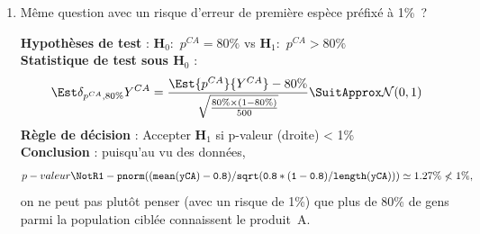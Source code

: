 \documentclass[10pt]{report}
\begin{document}
\begin{exercice}
\begin{enumerate}
\IndicR
\begin{Verbatim}[frame=leftline,fontfamily=tt,fontshape=n,numbers=left]
> yCA
  [1] 1 0 1 1 1 1 0 1 1 1 0 1 1 1 1 1 1 1 1 1 0 1 1 1 0 0 1 1 1 1 1 1 1 1 1 1 1
 [38] 1 1 0 1 0 1 1 1 1 1 1 1 0 1 1 1 0 1 0 1 1 1 0 0 1 1 1 1 1 1 1 1 1 1 1 1 1
...
[445] 1 1 1 0 1 1 1 1 1 0 1 0 1 1 1 1 1 1 1 1 1 1 1 1 1 1 1 0 1 1 1 1 0 0 1 1 1
[482] 1 1 1 1 1 1 1 0 1 1 1 1 1 1 1 1 1 1 1
> mean(yCA)
[1] 0.84
> # deltaEst.H0 <- (instruction R à fournir dans la rédaction)
> deltaEst.H0
[1] 2.236068
> pnorm(deltaEst.H0)
[1] 0.9873263
\end{Verbatim}

\begin{Correction}

\noindent \textbf{Hypothèses de test} : $\mathbf{H}_0:$ $p^{CA}=80\%$ vs {\large $\mathbf{H}_1:$ $p^{CA}>80\%$}\\
\textbf{Statistique de test sous $\mathbf{H}_0$} :
  $$
  \Est{\delta_{p^{CA},80\%}}{Y^{CA}}= {\displaystyle \frac{\Est{p^{CA}}{Y^{CA}}-80\%}{
\sqrt{\frac{80\%\times (1-80\%)} {500}}
}} 
  \SuitApprox \mathcal{N}(0,1)
  $$
\textbf{Règle de décision} : Accepter $\mathbf{H}_1$ si 
  p-valeur (droite) < 5\%\\
\noindent \textbf{Conclusion} :
puisqu'au vu des données, 
  \[
p-valeur\NotR\mathtt{1-pnorm((mean(yCA)-0.8)/sqrt(0.8*(1-0.8)/length(yCA)))} \simeq 1.27\% < 5\%,
\]
on peut plutôt penser (avec un risque de 5\%) que plus de 80\% de gens parmi la population cibl{\'e}e connaissent le produit~A.
\end{Correction}


\item M{\^e}me question avec un risque d'erreur de premi{\`e}re esp{\`e}ce pr{\'e}fix{\'e} {\`a} 1\%~?


 \begin{Correction}

\noindent \textbf{Hypothèses de test} : $\mathbf{H}_0:$ $p^{CA}=80\%$ vs {\large $\mathbf{H}_1:$ $p^{CA}>80\%$}\\
\textbf{Statistique de test sous $\mathbf{H}_0$} :
  $$
  \Est{\delta_{p^{CA},80\%}}{Y^{CA}}= {\displaystyle \frac{\Est{p^{CA}}{Y^{CA}}-80\%}{
\sqrt{\frac{80\%\times (1-80\%)} {500}}
}} 
  \SuitApprox \mathcal{N}(0,1)
  $$
\textbf{Règle de décision} : Accepter $\mathbf{H}_1$ si 
  p-valeur (droite) < 1\%\\
\noindent \textbf{Conclusion} :
puisqu'au vu des données, 
  \[
p-valeur\NotR\mathtt{1-pnorm((mean(yCA)-0.8)/sqrt(0.8*(1-0.8)/length(yCA)))} \simeq 1.27\%\nless1\%,
\]
on ne peut pas plutôt penser (avec un risque de 1\%) que plus de 80\% de gens parmi la population cibl{\'e}e connaissent le produit~A.
\end{Correction}



\end{enumerate}
\end{exercice}
\end{document}
